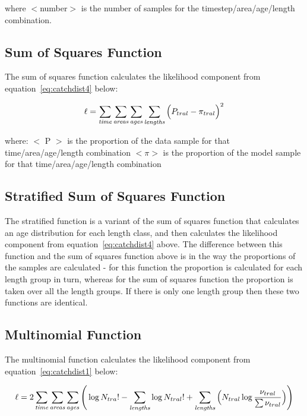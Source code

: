 \documentclass[10pt,twoside]{book}
\begin{document}
where $<$number$>$ is the number of samples for the timestep/area/age/length combination.

\subsection{Sum of Squares Function}
The sum of squares function calculates the likelihood component from equation~\ref{eq:catchdist4} below:

\begin{equation}\label{eq:catchdist4}
\ell = \sum_{\it time}\sum_{\it areas}\sum_{\it ages}\sum_{\it lengths} \Big( P_{tral} - \pi_{tral} \Big) ^2
\end{equation}

where:\newline
$<$ P $>$ is the proportion of the data sample for that time/area/age/length combination\newline
$<\pi>$ is the proportion of the model sample for that time/area/age/length combination

\subsection{Stratified Sum of Squares Function}
The stratified function is a variant of the sum of squares function that calculates an age distribution for each length class, and then calculates the likelihood component from equation~\ref{eq:catchdist4} above.  The difference between this function and the sum of squares function above is in the way the proportions of the samples are calculated - for this function the proportion is calculated for each length group in turn, whereas for the sum of squares function the proportion is taken over all the length groups.  If there is only one length group then these two functions are identical.

\subsection{Multinomial Function}
The multinomial function calculates the likelihood component from equation~\ref{eq:catchdist1} below:

\begin{equation}\label{eq:catchdist1}
\ell = 2 \sum_{\it time}\sum_{\it areas}\sum_{\it ages} \Bigg( \log N_{tra}! - \sum_{\it lengths} \log N_{tral}! + \sum_{\it lengths} \Big( N_{tral} \log {\frac{\nu_{tral}}{\sum \nu_{tral}}} \Big) \Bigg)
\end{equation}
\end{document}
